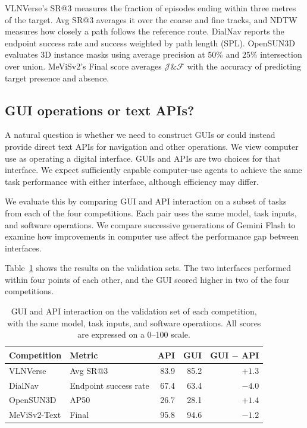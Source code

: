 \documentclass{article}
\begin{document}
VLNVerse's SR@3 measures the fraction of episodes ending within three metres of the target. Avg SR@3 averages it over the coarse and fine tracks, and NDTW measures how closely a path follows the reference route. DialNav reports the endpoint success rate and success weighted by path length (SPL). OpenSUN3D evaluates 3D instance masks using average precision at 50\% and 25\% intersection over union. MeViSv2's Final score averages $\mathcal{J}\&\mathcal{F}$ with the accuracy of predicting target presence and absence.

\subsection{GUI operations or text APIs?}

A natural question is whether we need to construct GUIs or could instead provide direct text APIs for navigation and other operations. We view computer use as operating a digital interface. GUIs and APIs are two choices for that interface. We expect sufficiently capable computer-use agents to achieve the same task performance with either interface, although efficiency may differ.

We evaluate this by comparing GUI and API interaction on a subset of tasks from each of the four competitions. Each pair uses the same model, task inputs, and software operations. We compare successive generations of Gemini Flash to examine how improvements in computer use affect the performance gap between interfaces.

Table~\ref{tab:gui-api} shows the results on the validation sets. The two interfaces performed within four points of each other, and the GUI scored higher in two of the four competitions.

\begin{table}[!ht]
    \centering
    \caption{GUI and API interaction on the validation set of each competition, with the same model, task inputs, and software operations. All scores are expressed on a 0--100 scale.}
    \label{tab:gui-api}
    \begin{tabular}{@{}llrrr@{}}
        \toprule
        Competition & Metric & API & GUI & GUI $-$ API \\
        \midrule
        VLNVerse & Avg SR@3 & 83.9 & 85.2 & $+1.3$ \\
        DialNav & Endpoint success rate & 67.4 & 63.4 & $-4.0$ \\
        OpenSUN3D & AP50 & 26.7 & 28.1 & $+1.4$ \\
        MeViSv2-Text & Final & 95.8 & 94.6 & $-1.2$ \\
        \bottomrule
    \end{tabular}
\end{table}
\end{document}
